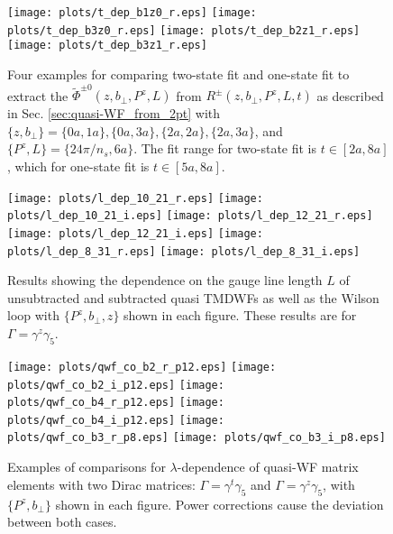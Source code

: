 \documentclass[prd,aps,twocolumn,preprintnumbers, showpacs, nofootinbib,superscriptaddress,notitlepage]{revtex4-1}
\newcommand\bl{\color{blue}}
\begin{document}
\newpage
\begin{widetext}


\begin{figure}
    \centering
    \texttt{[image: plots/t\_dep\_b1z0\_r.eps]}
    \texttt{[image: plots/t\_dep\_b3z0\_r.eps]}
    \texttt{[image: plots/t\_dep\_b2z1\_r.eps]}
    \texttt{[image: plots/t\_dep\_b3z1\_r.eps]}
    \caption{Four examples for comparing two-state fit and one-state fit to extract the $\tilde{\Phi}^{\pm0}(z,b_{\perp},P^z,L)$ from $R^{\pm}(z,b_{\perp},P^z,L,t)$ as described in Sec. \ref{sec:quasi-WF_from_2pt} with $\{z,b_{\perp}\}=\{0a,1a\},\{0a,3a\},\{2a,2a\},\{2a,3a\}$, and $\{P^z,L\}=\{24\pi/n_s,6a\}$. The fit range for two-state fit is $t\in[2a,8a]$, which for one-state fit is $t\in[5a,8a]$.}
    \label{fig:t_dep}
\end{figure}


\begin{figure}
    \centering
    \texttt{[image: plots/l\_dep\_10\_21\_r.eps]}
    \texttt{[image: plots/l\_dep\_10\_21\_i.eps]}
    \texttt{[image: plots/l\_dep\_12\_21\_r.eps]}
    \texttt{[image: plots/l\_dep\_12\_21\_i.eps]}
    \texttt{[image: plots/l\_dep\_8\_31\_r.eps]}
    \texttt{[image: plots/l\_dep\_8\_31\_i.eps]}
    \caption{Results {\bl showing the dependence  on the gauge line length $L$} of unsubtracted {\bl and} subtracted quasi TMDWFs {\bl as well as the} Wilson loop with $\{P^z,b_{\perp},z\}$ shown in each figure. {\bl These results are for  $\Gamma=\gamma^z\gamma_5$.} }
    \label{fig:multi_l_dep}
\end{figure}

\begin{figure}
    \centering
    \texttt{[image: plots/qwf\_co\_b2\_r\_p12.eps]}
    \texttt{[image: plots/qwf\_co\_b2\_i\_p12.eps]}
    \texttt{[image: plots/qwf\_co\_b4\_r\_p12.eps]}
    \texttt{[image: plots/qwf\_co\_b4\_i\_p12.eps]}
    \texttt{[image: plots/qwf\_co\_b3\_r\_p8.eps]}
    \texttt{[image: plots/qwf\_co\_b3\_i\_p8.eps]}
    \caption{Examples of comparisons for $\lambda$-dependence of quasi-WF matrix elements with two Dirac matrices: $\Gamma=\gamma^t\gamma_5$ and $\Gamma=\gamma^z\gamma_5$, with $\{P^z,b_{\perp}\}$ shown in each figure. Power corrections cause the deviation between {\bl both} cases.}
    \label{fig:multi_qwf_co}
\end{figure}


\end{widetext}
\end{document}
